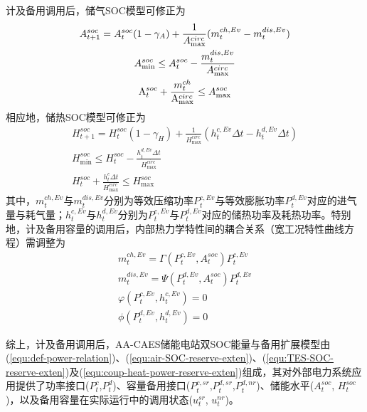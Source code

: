 计及备用调用后，储气SOC模型可修正为
\begin{subequations}
\label{equ:air-SOC-reserve-exten}
\begin{gather}
A_{t + 1}^{soc} = A_t^{soc}(1-\gamma_A) + \frac{1}{{{A_{\max}^{circ}}}}({m_t^{ch,Ev} - m_t^{dis,Ev}})\\
A_{\min }^{soc} \le A_t^{soc} - \frac{{m_t^{dis,Ev}}}{{{A_{\max}^{circ}}}}\\
{\rm{A}}_t^{soc} + \frac{{m_t^{ch}}}{{{{\rm{A}}_{\max}^{circ}}}} \le A_{\max }^{soc}
\end{gather}
\end{subequations}
相应地，储热SOC模型可修正为
\begin{subequations}
\label{equ:TES-SOC-reserve-exten}
\begin{gather}
H_{t + 1}^{soc} = H_t^{soc}(1-\gamma_H) + \frac{1}{{{H_{\max}^{circ}}}}({h_t^{c,Ev}\Delta t - h_t^{d,Ev}\Delta t})\\
H_{\min }^{soc} \le H_t^{soc} - \frac{{h_t^{d,Ev}\Delta t}}{{{H_{\max}^{circ}}}}\\
H_t^{soc} + \frac{{h_t^c\Delta t}}{{{H_{\max}^{circ}}}} \le H_{\max }^{soc}
\end{gather}
\end{subequations}
其中，$m_t^{ch,Ev}$与$m_t^{dis,Ev}$分别为等效压缩功率$P_t^{c,Ev}$与等效膨胀功率$P_t^{d,Ev}$对应的进气量与耗气量；$h_t^{c,Ev}$与$h_t^{d,Ev}$分别为$P_t^{c,Ev}$与$P_t^{d,Ev}$对应的储热功率及耗热功率。特别地，计及备用容量的调用后，内部热力学特性间的耦合关系（宽工况特性曲线方程）需调整为
\begin{subequations}
\label{equ:coup-heat-power-reserve-exten}
\begin{gather}
m_t^{ch,Ev} = \Gamma ({P_t^{c,Ev},A_t^{soc}})P_t^{c,Ev}\\
m_t^{dis,Ev} = \Psi ({P_t^{d,Ev},A_t^{soc}})P_t^{d,Ev}\\
\varphi ({P_t^{c,Ev},h_t^{c,Ev}}) = 0\\
\phi ({P_t^{d,Ev},h_t^{d,Ev}}) = 0
\end{gather}
\end{subequations}

综上，计及备用调用后，AA-CAES储能电站双SOC能量与备用扩展模型由(\ref{equ:def-power-relation})、(\ref{equ:air-SOC-reserve-exten})、(\ref{equ:TES-SOC-reserve-exten})及(\ref{equ:coup-heat-power-reserve-exten})组成，其对外部电力系统应用提供了功率接口($P_t^c$,$P_t^d$)、容量备用接口($P_t^{c,sr}$,$P_t^{d,sr}$,$P_t^{d,nr}$)、储能水平($A_t^{soc}$, $H_t^{soc}$)，以及备用容量在实际运行中的调用状态($u_t^{sr}$, $u_t^{nr}$)。

